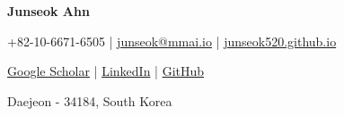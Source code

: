 \documentclass[a4paper,11pt]{article}
\newcommand{\socialicon}[1]{\raisebox{-0.05em}{\resizebox{!}{1em}{#1}}}
\newcommand{\ieeeicon}[1]{\raisebox{-0.3em}{\resizebox{!}{1.3em}{#1}}}
\newcommand{\headerfontiii}{\fontfamily{ppl}\selectfont} %
\begin{document}
\headerfontiii

\begin{center}
    {\Huge\textbf{Junseok Ahn}}
\end{center}
\vspace{-3mm}

\begin{center}
    {\small
    +82-10-6671-6505 | \href{mailto:junseok@mmai.io}{junseok@mmai.io} | 
    \href{https://junseok520.github.io/}{junseok520.github.io}
    }
\end{center}
\vspace{-6mm}

\begin{center}
    {\small
    \socialicon{\aiGoogleScholar} \href{https://scholar.google.com/citations?user=F1ZDPYAAAAAJ&hl}{Google Scholar} |
    \socialicon{\faLinkedin} \href{https://www.linkedin.com/in/junseok-ahn-3016aa243}{LinkedIn} | 
    \socialicon{\faGithub} \href{https://github.com/junseok520}{GitHub}
    }
\end{center}
\vspace{-6mm}
\begin{center}
    {\small Daejeon - 34184, South Korea}
\end{center}

\vspace{-4mm}
\end{document}

